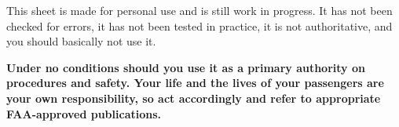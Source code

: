 
  This sheet is made for personal use and is still work in
  progress.  It has not been checked for errors, it has not been
  tested in practice, it is not authoritative, and you should
  basically not use it.  

  \textbf{\textsf{Under no conditions should you use it as a primary
      authority on procedures and safety.  Your life and the lives of
      your passengers are your own responsibility, so act accordingly
      and refer to appropriate FAA-approved publications.}}
